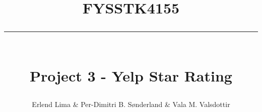 \newcommand{\horrule}[1]{\rule{\linewidth}{#1}} %

\title{
\large \textsc{FYSSTK4155} \\ [25pt]
\horrule{0.5pt} \\[0.4cm]
\huge Project 3 - Yelp Star Rating}

\author{Erlend Lima \& Per-Dimitri B. Sønderland \& Vala M. Valsdottir}

